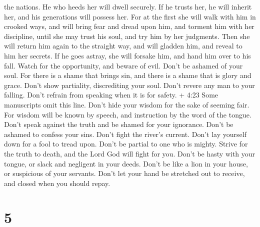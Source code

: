 the nations. He who heeds her will dwell securely.  If he
trusts her, he will inherit her, and his generations will possess her.
 For at the first she will walk with him in crooked ways,
and will bring fear and dread upon him, and torment him with her
discipline, until she may trust his soul, and try him by her judgments.
 Then she will return him again to the straight way, and
will gladden him, and reveal to him her secrets.  If he
goes astray, she will forsake him, and hand him over to his fall.
 Watch for the opportunity, and beware of evil. Don't be
ashamed of your soul.  For there is a shame that brings
sin, and there is a shame that is glory and grace.  Don't
show partiality, discrediting your soul. Don't revere any man to your
falling.  Don't refrain from speaking when it is for
safety. + 4:23 Some manuscripts omit this line. Don't hide your wisdom
for the sake of seeming fair.  For wisdom will be known by
speech, and instruction by the word of the tongue.  Don't
speak against the truth and be shamed for your ignorance. 
Don't be ashamed to confess your sins. Don't fight the river's current.
 Don't lay yourself down for a fool to tread upon. Don't be
partial to one who is mighty.  Strive for the truth to
death, and the Lord God will fight for you.  Don't be hasty
with your tongue, or slack and negligent in your deeds. 
Don't be like a lion in your house, or suspicious of your servants.
 Don't let your hand be stretched out to receive, and
closed when you should repay.

\hypertarget{section-1}{%
\section{5}\label{section-1}}

